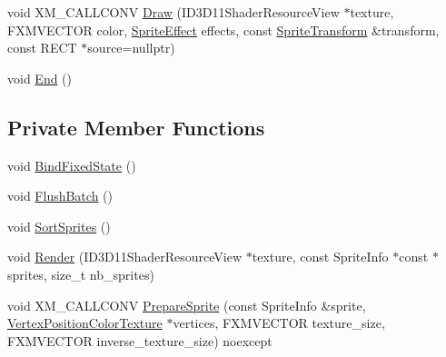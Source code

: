 \begin{DoxyCompactItemize}
\item 
void X\+M\+\_\+\+C\+A\+L\+L\+C\+O\+NV \mbox{\hyperlink{classmage_1_1rendering_1_1_sprite_batch_1_1_impl_a62585b07c1b2ede917ad49c0cfda57f1}{Draw}} (I\+D3\+D11\+Shader\+Resource\+View $\ast$texture, F\+X\+M\+V\+E\+C\+T\+OR color, \mbox{\hyperlink{namespacemage_1_1rendering_a4dbc3536c87b906f1d41d863ec458e78}{Sprite\+Effect}} effects, const \mbox{\hyperlink{classmage_1_1_sprite_transform}{Sprite\+Transform}} \&transform, const R\+E\+CT $\ast$source=nullptr)
\item 
void \mbox{\hyperlink{classmage_1_1rendering_1_1_sprite_batch_1_1_impl_a46d4871b99ac78e00f703ca4297e67f3}{End}} ()
\end{DoxyCompactItemize}
\subsection*{Private Member Functions}
\begin{DoxyCompactItemize}
\item 
void \mbox{\hyperlink{classmage_1_1rendering_1_1_sprite_batch_1_1_impl_ab07518664c50c9ddd08eb484bc0df0e0}{Bind\+Fixed\+State}} ()
\item 
void \mbox{\hyperlink{classmage_1_1rendering_1_1_sprite_batch_1_1_impl_a65afd35385400d629abc9f60adfadeff}{Flush\+Batch}} ()
\item 
void \mbox{\hyperlink{classmage_1_1rendering_1_1_sprite_batch_1_1_impl_a2573f39b9f7f87b2acd7eadc348c1e2b}{Sort\+Sprites}} ()
\item 
void \mbox{\hyperlink{classmage_1_1rendering_1_1_sprite_batch_1_1_impl_af66d8d8d75a33ea8291d81400f4a47b6}{Render}} (I\+D3\+D11\+Shader\+Resource\+View $\ast$texture, const Sprite\+Info $\ast$const $\ast$sprites, size\+\_\+t nb\+\_\+sprites)
\item 
void X\+M\+\_\+\+C\+A\+L\+L\+C\+O\+NV \mbox{\hyperlink{classmage_1_1rendering_1_1_sprite_batch_1_1_impl_adce1a1942833a97fb14a20bc4add8c31}{Prepare\+Sprite}} (const Sprite\+Info \&sprite, \mbox{\hyperlink{structmage_1_1rendering_1_1_vertex_position_color_texture}{Vertex\+Position\+Color\+Texture}} $\ast$vertices, F\+X\+M\+V\+E\+C\+T\+OR texture\+\_\+size, F\+X\+M\+V\+E\+C\+T\+OR inverse\+\_\+texture\+\_\+size) noexcept
\end{DoxyCompactItemize}
